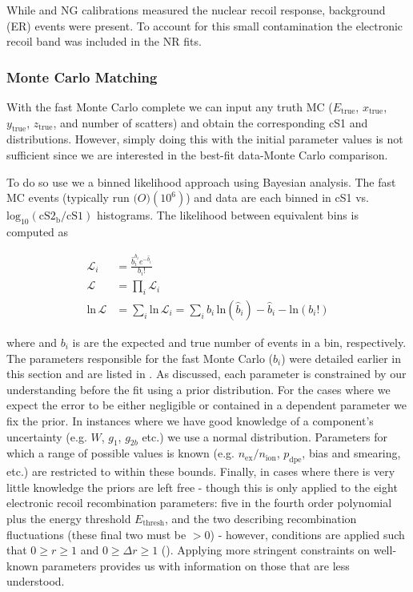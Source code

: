 While \ambe and NG calibrations measured the nuclear recoil response, background (ER) events were present.  To account for this small
contamination the electronic recoil band was included in the NR fits.




\subsubsection{Monte Carlo Matching}
\label{subsubsec:er_nr_calibrations_parameter_determ_mc_match}
With the fast Monte Carlo complete we can input any truth MC ($E_{\mathrm{true}}$, $x_{\mathrm{true}}$, $y_{\mathrm{true}}$,
$z_{\mathrm{true}}$, and number of scatters) and obtain the corresponding cS1 and \cstwob distributions.  However, simply doing this with
the initial parameter values is not sufficient since we are interested in the best-fit data-Monte Carlo comparison.

To do so use we a binned likelihood approach using Bayesian analysis.  The fast MC events (typically run $\mathcal(O)(10^6)$) and data are
each binned in cS1 vs. $\mathrm{log_{10}(cS2_b / cS1)}$ histograms.  The likelihood between equivalent bins \li is computed as

\begin{equation}
\begin{aligned}
\mathcal{L}_i &=\frac{\hat{b}_{i}^{b_i} e^{-\hat{b}_{i}}}{b_{i}!} \\
\mathcal{L} &= \prod_i \mathcal{L}_i \\
\mathrm{ln}\, \mathcal{L} &= \sum_i \mathrm{ln}\, \mathcal{L}_i = \sum_i b_i\, \mathrm{ln} (\hat{b}_i) - \hat{b}_i - \mathrm{ln} (b_i !)
\end{aligned}
\end{equation}

\noindent where \bhi and $b_i$ is are the expected and true number of events in a bin, respectively.  The parameters responsible
for the fast Monte Carlo ($\hat{b}_i$) were detailed earlier in this section and are listed in
.  As discussed, each parameter is constrained by our understanding before
the fit using a prior distribution.  For the cases where we expect the error to be either negligible or contained in a dependent parameter
we fix the prior.  In instances where we have good knowledge of a component's uncertainty (e.g. $W$, $g_1$, $g_{2b}$ etc.) we use a normal
distribution.  Parameters for which a range of possible values is known (e.g. $n_{\mathrm{ex}} / n_{\mathrm{ion}}$, $p_{\mathrm{dpe}}$,
bias and smearing, etc.) are restricted to within these bounds.  Finally, in cases where there is very little knowledge the priors
are left free - though this is only applied to the eight electronic recoil recombination parameters: five in the fourth order polynomial
plus the energy threshold $E_{\mathrm{thresh}}$, and the two describing recombination fluctuations (these final two must be
$> 0$) - however, conditions are applied such that $0 \geq r \geq 1$ and $0 \geq \Delta r \geq 1$
().  Applying more stringent constraints on well-known parameters provides us
with information on those that are less understood.

